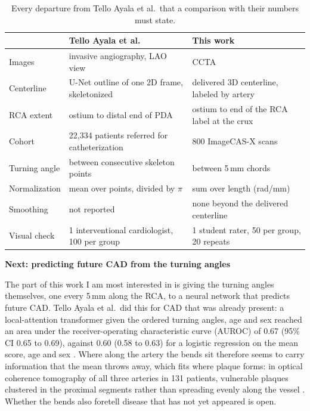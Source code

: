 \begin{table}[H]
  \centering
  \small
  \begin{tabular}{@{}p{2.3cm}p{6.3cm}p{6.3cm}@{}}
    \toprule
    & Tello Ayala et al.\ \cite{telloayala2026tortuosity} & This work \\
    \midrule
    Images & invasive angiography, LAO view & CCTA \\
    Centerline & U-Net outline of one 2D frame, skeletonized & delivered 3D centerline, labeled by artery \\
    RCA extent & ostium to distal end of PDA & ostium to end of the RCA label at the crux \\
    Cohort & 22,334 patients referred for catheterization & 800 ImageCAS-X scans \\
    Turning angle & between consecutive skeleton points & between 5\,mm chords \\
    Normalization & mean over points, divided by $\pi$ & sum over length (rad/mm) \\
    Smoothing & not reported & none beyond the delivered centerline \\
    Visual check & 1 interventional cardiologist, 100 per group & 1 student rater, 50 per group, 20 repeats \\
    \bottomrule
  \end{tabular}
  \caption{Every departure from Tello Ayala et al.\ that a comparison with their numbers must state.}
  \label{tab:deviations}
\end{table}

\medskip
\noindent \textbf{Next: predicting future CAD from the turning angles}

\noindent The part of this work I am most interested in is giving the turning angles themselves,
one every 5\,mm along the RCA, to a neural network that predicts future CAD.
Tello Ayala et al.\ did this for CAD that was already present: a local-attention transformer given
the ordered turning angles, age and sex reached an area under the receiver-operating characteristic
curve (AUROC) of 0.67 (95\% CI 0.65 to 0.69), against 0.60 (0.58 to 0.63) for a logistic regression
on the mean score, age and sex \cite{telloayala2026tortuosity}.
Where along the artery the bends sit therefore seems to carry information that the mean throws away,
which fits where plaque forms: in optical coherence tomography of all three arteries in 131
patients, vulnerable plaques clustered in the proximal segments rather than spreading evenly along
the vessel \cite{araki2020plaques}.
Whether the bends also foretell disease that has not yet appeared is open.

